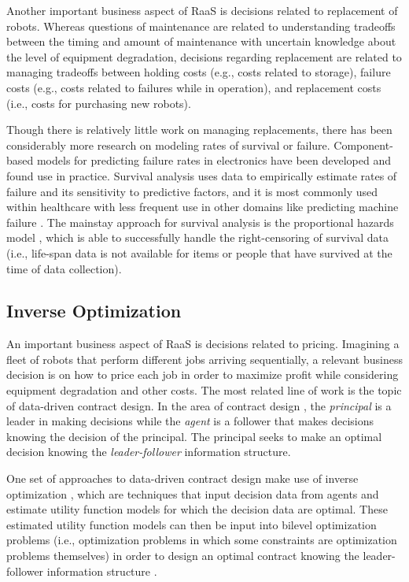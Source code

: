 \documentclass[conference]{IEEEtran}
\begin{document}
Another important business aspect of RaaS is decisions related to replacement of robots. Whereas questions of maintenance are related to understanding tradeoffs between the timing and amount of maintenance with uncertain knowledge about the level of equipment degradation, decisions regarding replacement are related to managing tradeoffs between holding costs (e.g., costs related to storage), failure costs (e.g., costs related to failures while in operation), and replacement costs (i.e., costs for purchasing new robots). 

Though there is relatively little work on managing replacements, there has been considerably more research on modeling rates of survival or failure. Component-based models for predicting failure rates in electronics have been developed \cite{mil-hdbk-217f,hinton2006prism} and found use in practice. Survival analysis \cite{vittinghoff2012regression,karim2019reliability} uses data to empirically estimate rates of failure and its sensitivity to predictive factors, and it is most commonly used within healthcare \cite{vittinghoff2012regression,collett2015modelling,eloranta2021cancer} with less frequent use in other domains like predicting machine failure \cite{karim2019reliability,papathanasiou2023machine}. The mainstay approach for survival analysis is the proportional hazards model \cite{cox1972regression,kumar1994proportional}, which is able to successfully handle the right-censoring of survival data (i.e.,  life-span data is not available for items or people that have survived at the time of data collection).

\subsection{Inverse Optimization}

An important business aspect of RaaS is decisions related to pricing. Imagining a fleet of robots that perform different jobs arriving sequentially, a relevant business decision is on how to price each job in order to maximize profit while considering equipment degradation and other costs. The most related line of work is the topic of data-driven contract design. In the area of contract design \cite{laffont2002theory}, the \emph{principal} is a leader in making decisions while the \emph{agent} is a follower that makes decisions knowing the decision of the principal. The principal seeks to make an optimal decision knowing the \emph{leader-follower} information structure. 


One set of approaches to data-driven contract design make use of inverse optimization \cite{aswani2018inverse,chan2025inverse}, which are techniques that input decision data from agents and estimate utility function models for which the decision data are optimal. These estimated utility function models can then be input into bilevel optimization problems (i.e., optimization problems in which some constraints are optimization problems themselves) in order to design an optimal contract knowing the leader-follower information structure \cite{aswani2019data,mintz2023behavioral,li2025adaptive}.
\end{document}
